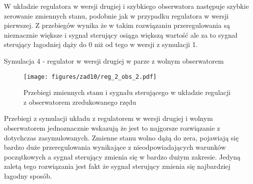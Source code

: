 \documentclass[a4paper,titlepage,11pt,floatssmall]{mwrep}
\begin{document}
W układzie regulatora w wersji drugiej i szybkiego obserwatora następuje szybkie zerowanie zmiennych stanu, podobnie jak w przypadku regulatora w wersji pierwszej. Z przebiegów wynika że w takim rozwiązaniu przeregulowania są nieznacznie większe i sygnał sterujący osiąga większą wartość ale za to sygnał sterujący  łagodniej dąży do 0 niż od tego w wersji z symulacji 1. 
\newpage 

\indent Symulacja 4 - regulator w wersji drugiej w parze z wolnym  obserwatorem
\begin{figure}[H]
\centering
\texttt{[image: figures/zad10/reg\_2\_obs\_2.pdf]}
\caption{Przebiegi zmiennych stanu i sygnału sterującego w układzie regulacji z obserwatorem zredukowanego rzędu}
\end{figure}

Przebiegi z symulacji układu z regulatorem w wersji drugiej i wolnym obserwatorem jednoznacznie wskazują że jest to najgorsze rozwiązanie z dotychczas zasymulowanych. Zmienne stanu wolno dążą do zera, pojawiają się bardzo duże przeregulowania wynikające z nieodpowiadających warunków początkowych a sygnał sterujący zmienia się w bardzo dużym zakresie. Jedyną zaletą tego rozwiązania jest fakt że sygnał sterujący zmienia się najbardziej łagodny sposób.
\newpage 
\end{document}

